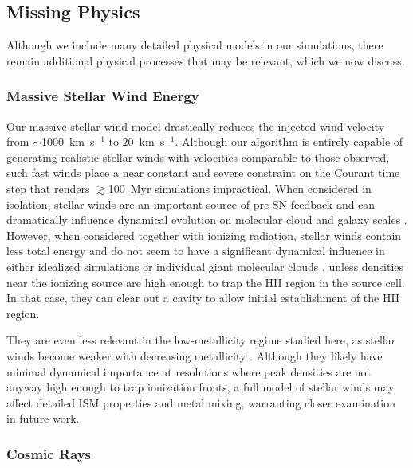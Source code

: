 \documentclass[fleqn,usenatbib,useAMS]{mnras}
\begin{document}
\subsection{Missing Physics}
Although we include many detailed physical models in our simulations, there remain additional physical processes that may be relevant, which we now discuss.

\subsubsection{Massive Stellar Wind Energy}
\label{sec:stellar winds discussion}
Our massive stellar wind model drastically reduces the injected wind velocity from $\sim$1000~km~s$^{-1}$ to 20~km~s$^{-1}$. Although our algorithm is entirely capable of generating realistic stellar winds with velocities comparable to those observed, such fast winds place a near constant and severe constraint on the Courant time step that renders $\gtrsim$100~Myr simulations impractical. When considered in isolation, stellar winds are an important source of pre-SN feedback and can dramatically influence dynamical evolution on molecular cloud and galaxy scales \citep{Dale2008,Peters2017,Gatto2017}. However, when considered together with ionizing radiation, stellar winds contain less total energy \citep{Agertz2013} and do not seem to have a significant dynamical influence in either idealized simulations \citep{Geen2015} or  individual giant molecular clouds \citep{Dale2014}, unless densities near the ionizing source are high enough to trap the  HII region in the source cell. In that case, they can clear out a cavity to allow initial establishment of the HII region. 

They are even less relevant in the low-metallicity regime studied here, as stellar winds become weaker with decreasing metallicity \citep{Puls2000, Vink2005}. Although they likely have minimal dynamical importance at resolutions where peak densities are not anyway high enough to trap ionization fronts, a full model of stellar winds may affect detailed ISM properties and metal mixing, warranting closer examination in future work.


\subsubsection{Cosmic Rays} 
\end{document}

